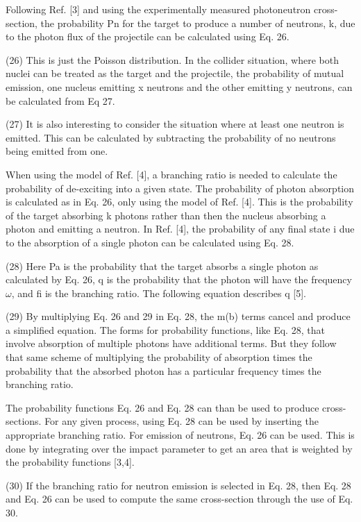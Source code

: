    Following Ref.
    [3] and using the experimentally measured photoneutron cross-section, the probability Pn for the target to produce a number of neutrons, k, due to the photon flux of the projectile can be calculated using Eq.
    26.

    (26)
    This is just the Poisson distribution.
    In the collider situation, where both nuclei can be treated as the target and the projectile, the probability of mutual emission, one nucleus emitting x neutrons and the other emitting y neutrons, can be calculated from Eq 27.

    (27)
    It is also interesting to consider the situation where at least one neutron is emitted.
    This can be calculated by subtracting the probability of no neutrons being emitted from one.

    When using the model of Ref.
    [4], a branching ratio is needed to calculate the probability of de-exciting into a given state.
    The probability of photon absorption is calculated as in Eq.
    26, only using the model of Ref.
    [4].
    This is the probability of the target absorbing k photons rather than then the nucleus absorbing a photon and emitting a neutron.
    In Ref.
    [4], the probability of any final state i due to the absorption of a single photon can be calculated using Eq.
    28.

    (28)
    Here Pa is the probability that the target absorbs a single photon as calculated by Eq.
    26, q is the probability that the photon will have the frequency $\omega$, and fi is the branching ratio.
    The following equation describes q [5].

    (29)
    By multiplying Eq.
    26 and 29 in Eq.
    28, the m(b) terms cancel and produce a simplified equation.
    The forms for probability functions, like Eq.
    28, that involve absorption of multiple photons have additional terms.
    But they follow that same scheme of multiplying the probability of absorption times the probability that the absorbed photon has a particular frequency times the branching ratio.

    The probability functions Eq.
    26 and Eq.
    28 can than be used to produce cross-sections.
    For any given process, using Eq.
    28 can be used by inserting the appropriate branching ratio.
    For emission of neutrons, Eq.
    26 can be used.
    This is done by integrating over the impact parameter to get an area that is weighted by the probability functions [3,4].

    (30)
    If the branching ratio for neutron emission is selected in Eq.
    28, then Eq.
    28 and Eq.
    26 can be used to compute the same cross-section through the use of Eq.
    30.
    
